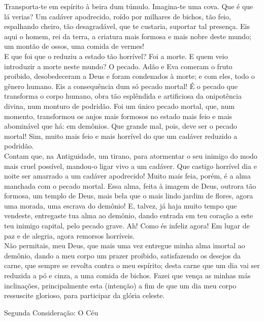 \documentclass{book}
\begin{document}
\begin{flushleft}
    Transporta-te em espírito à beira dum túmulo. Imagina-te uma cova. Que é que lá verias? Um cadáver apodrecido, roído por milhares de bichos, tão feio, espalhando cheiro, tão desagradável, que te custaria, suportar tal presença. Eis aqui o homem, rei da terra, a criatura mais formosa e mais nobre deste mundo; um montão de ossos, uma comida de vermes!
    \vspace{.2cm} \\
    E que foi que o reduziu a estado tão horrível? Foi a morte. E quem veio introduzir a morte neste mundo? O pecado. Adão e Eva comeram o fruto proibido, desobedeceram a Deus e foram condenados à morte; e com eles, todo o gênero humano. Eis a consequência dum só pecado mortal! É o pecado que transforma o corpo humano, obra tão esplêndida e artificiosa da onipotência divina, num monturo de podridão. Foi um único pecado mortal, que, num momento, transformou os anjos mais formosos no estado mais feio e mais abominável que há: em demônios. Que grande mal, pois, deve ser o pecado mortal! Sim, muito mais feio e mais horrível do que um cadáver reduzido a podridão.
    \vspace{.2cm} \\
    Contam que, na Antiguidade, um tirano, para atormentar o seu inimigo do modo mais cruel possível, mandou-o ligar vivo a um cadáver. Que castigo horrível dia e noite ser amarrado a um cadáver apodrecido! Muito mais feia, porém, é a alma manchada com o pecado mortal. Essa alma, feita à imagem de Deus, outrora tão formosa, um templo de Deus, mais bela que o mais lindo jardim de flores, agora uma morada, uma escrava do demônio! E, talvez, já haja muito tempo que vendeste, entregaste tua alma ao demônio, dando entrada em teu coração a este teu inimigo capital, pelo pecado grave. Ah! Como és infeliz agora! Em lugar de paz e de alegria, agora remorsos horríveis.
    \vspace{.2cm} \\
    Não permitais, meu Deus, que mais uma vez entregue minha alma imortal ao demônio, dando a meu corpo um prazer proibido, satisfazendo os desejos da carne, que sempre se revolta contra o meu espírito; desta carne que um dia vai ser reduzida a pó e cinza, a uma comida de bichos. Fazei que vença as minhas más inclinações, principalmente esta \textcolor{VioletRed2}{(intenção)} a fim de que um dia meu corpo ressuscite glorioso, para participar da glória celeste.
\end{flushleft}
\newpage
\begin{center}
    \textcolor{VioletRed2}{Segunda Consideração: O Céu}
\end{center}
\end{document}
